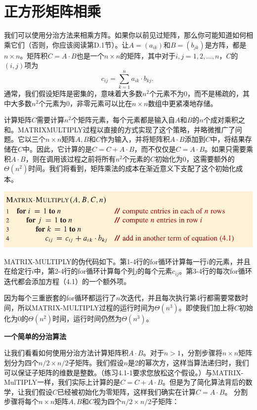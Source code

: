 \documentclass[lang=cn,newtx,10pt,scheme=chinese]{elegantbook}
\begin{document}
\section{正方形矩阵相乘}

我们可以使用分治方法来相乘方阵。如果你以前见过矩阵，那么你可能知道如何相乘它们（否则，你应该阅读第D.1节）。让$A=\left(a_{i k}\right)$和$B=\left(b_{j k}\right)$是方阵，都是$n \times n$。矩阵积$C=A \cdot B$也是一个$n \times n$的矩阵，其中对于$i, j=1,2, \ldots, n$，$C$的$(i, j)$项为
$$
c_{i j}=\sum_{k=1}^n a_{i k} \cdot b_{k j} \text {. }
$$
通常，我们假设矩阵是密集的，意味着大多数$n^2$个元素不为0，而不是稀疏的，其中大多数$n^2$个元素为0，非零元素可以比在$n \times n$数组中更紧凑地存储。

计算矩阵$C$需要计算$n^2$个矩阵元素，每个元素都是输入自$A$和$B$的$n$个成对乘积之和。MATRIXMULTIPLY过程以直接的方式实现了这个策略，并略微推广了问题。它以三个$n \times n$矩阵$A, B$和$C$作为输入，并将矩阵积$A \cdot B$添加到$C$中，将结果存储在$C$中。因此，它计算的是$C=C+A \cdot B$，而不仅仅是$C=A \cdot B$。如果只需要乘积$A \cdot B$，则在调用该过程之前将所有$n^2$个元素的$C$初始化为0，这需要额外的$\Theta\left(n^2\right)$时间。我们将看到，矩阵乘法的成本在渐近意义下支配了这个初始化成本。

\includegraphics{算法导论第四版插图/第四章/普通矩阵相乘算法.pdf}

MATRIX-MULTIPLY的伪代码如下。第1-4行的for循环计算每一行$i$的元素，并且在给定行$i$中，第2-4行的for循环计算每个列$j$的每个元素$c_{i j}$。第3-4行的每次for循环迭代都会添加方程（4.1）的一个额外项。

因为每个三重嵌套的for循环都运行了$n$次迭代，并且每次执行第4行都需要常数时间，所以MATRIX-MULTIPLY过程的运行时间为$\Theta\left(n^3\right)$。即使我们加上将$C$初始化为0的$\Theta\left(n^2\right)$时间，运行时间仍然为$\Theta\left(n^3\right)$。

\textbf{一个简单的分治算法}

让我们看看如何使用分治方法计算矩阵积$A \cdot B$。对于$n>1$，分割步骤将$n \times n$矩阵划分为四个$n / 2 \times n / 2$子矩阵。我们假设$n$是2的幂次方，这样当算法递归时，我们可以保证子矩阵的维数是整数。（练习4.1-1要求您放松这个假设。）与MATRIX-MulTIPLY一样，我们实际上计算的是$C=C+A \cdot B$。但是为了简化算法背后的数学，让我们假设$C$已经被初始化为零矩阵，这样我们确实在计算$C=A \cdot B$。
分割步骤将每个$n \times n$矩阵$A, B$和$C$视为四个$n / 2 \times n / 2$子矩阵：
\end{document}
